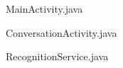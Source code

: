 \begin{frame}
\begin{block}{}
	MainActivity.java
\end{block}
\begin{block}{}
	ConversationActivity.java
\end{block}
\begin{block}{}
	RecognitionService.java
\end{block}
\end{frame}